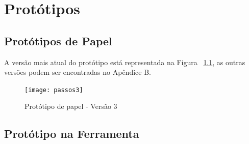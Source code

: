 \chapter{Protótipos}

\section{Protótipos de Papel}

	A versão mais atual do protótipo está representada na Figura ~\ref{fig:passos2}, as outras versões podem ser encontradas no Apêndice B.

\begin{figure}[!htb]
 \centering
 \texttt{[image: passos3]}
 \caption{Protótipo de papel - Versão 3}
 \label{fig:passos2}

\end{figure}

\section{Protótipo na Ferramenta}
\label{mobile2}

